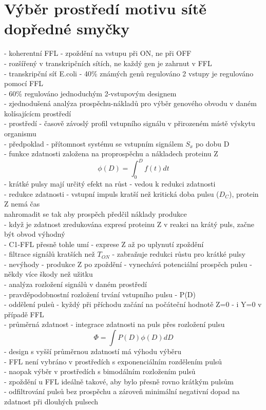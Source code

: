 \documentclass[11pt,a4paper]{report}
\begin{document}
\section{Výběr prostředí motivu sítě dopředné smyčky}
- koherentní FFL - zpoždění na vstupu při ON, ne při OFF\\ 
- rozšířený v transkripčních sítích, ne každý gen je zahrnut v FFL\\
- transkripční síť E.coli - 40\% známých genů regulováno 2 vstupy je regulováno pomocí FFL\\
\indent - 60\% regulováno jednoduchým 2-vstupovým designem\\
- zjednodušená analýza prospěchu-nákladů pro výběr genového obvodu v daném kolísajícícm prostředí\\
\indent - prostředí - časově závoslý profil vstupního signálu v přirozeném místě výskytu organismu\\
- předpoklad - přítomnost systému se vstupním signálem $S_x$ po dobu D\\
- funkce zdatnosti založena na proprospěchu a nákladech proteinu Z\\
\begin{equation}
\phi(D)=\int_0^Df(t)dt
\end{equation}
- krátké pulsy mají určitý efekt na růst - vedou k redukci zdatnosti\\
\indent - redukce zdatnosti - vstupní impuls kratší než kritická doba pulsu ($D_C$), protein Z nemá čas\\
\indent \indent nahromadit se tak aby prospěch předčil náklady produkce\\
- když je zdatnost zredukována expresí proteinu Z v reakci na krátý puls, začne být obvod výhodný\\
\indent - C1-FFL přesně tohle umí - exprese Z až po uplynutí zpoždění\\
- filtrace signálů kratších než $T_{ON}$ - zabraňuje redukci růstu pro krátké pulsy\\
- nevýhody - produkce Z po zpoždění - vynechává potenciální prospěch pulsu - někdy více škody než užitku\\
- analýza rozložení signálů v daném prostředí\\
\indent - pravděpodobnostní rozložení trvání vstupního pulsu - P(D)\\
\indent - oddělení pulsů - kyždý při příchodu začání na počáteční hodnotě Z=0 - i Y=0 v případě FFL\\
\indent - průměrná zdatnost - integrace zdatnosti na puls přes rozložení pulsu\\
\begin{equation}
\Phi=\int P(D)\phi(D)dD
\end{equation}
\indent - design s vyšší průměrnou zdatností má výhodu výběru\\
- FFL není vybráno v prostředích s exponenciálním rozdělením pulsů\\
- naopak výběr v prostředích s bimodálním rozložením pulsů\\
- zpoždění u FFL ideálně takové, aby bylo přesně rovno krátkým pulsům\\
- odfiltrování pulsů bez prospěchu a zároveň minimální negativní dopad na zdatnost při dlouhých pulsech\\
\end{document}
